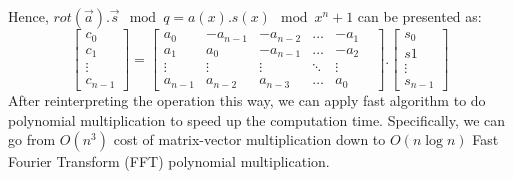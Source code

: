 \begin{description}
  Hence, $rot(\vec{a}).\vec{s} \mod q = a(x).s(x) \mod x^n + 1$ can be presented
  as:
  \[
    \begin{bmatrix}
      c_0\\
      c_1\\
      \vdots\\
      c_{n-1}
    \end{bmatrix} = \begin{bmatrix}
      a_0& -a_{n-1}& -a_{n-2}& \dots& -a_1\\
      a_1& a_0& -a_{n-1}& \dots& -a_2\\
      \vdots& \vdots& \vdots& \ddots& \vdots&\\
      a_{n-1}& a_{n-2}& a_{n-3}& \dots& a_0
    \end{bmatrix}.\begin{bmatrix} s_0 \\ s1\\ \vdots\\ s_{n-1}
    \end{bmatrix}
  \]
  After reinterpreting the operation this way, we can apply fast algorithm to do
  polynomial multiplication to speed up the computation time. Specifically, we
  can go from $O(n^3)$ cost of matrix-vector multiplication down to
  $O(n \log n)$ Fast Fourier Transform (FFT) polynomial multiplication.


\end{description}
